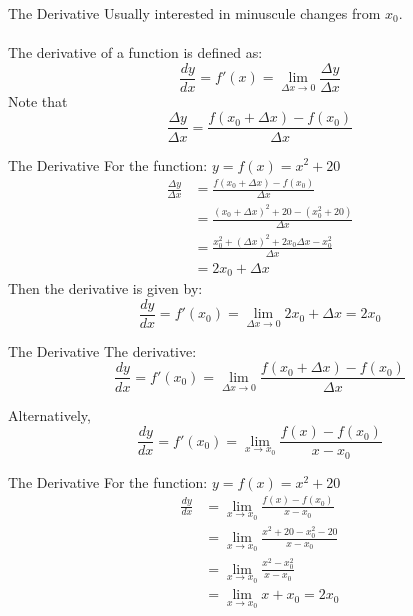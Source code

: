 \documentclass{./../../Latex/teaching_slides}
\begin{document}
\begin{frame}{The Derivative}
Usually interested in minuscule changes from $x_0$. \\~\\
The derivative of a function is defined as:
$$ \frac{d y}{d x} = f'(x)= \lim_{\Delta x \rightarrow 0} \frac{\Delta y}{\Delta x} $$
\vspace{1em}
Note that $$ \frac{\Delta y}{\Delta x}=\frac{f\left(x_{0}+\Delta x\right)-f\left(x_{0}\right)}{\Delta x}  $$
\end{frame}

\begin{frame}{The Derivative}
For the function: $y=f(x)=x^{2}+20$
\begin{align*} \frac{\Delta y}{\Delta x}&=\frac{f\left(x_{0}+\Delta x\right)-f\left(x_{0}\right)}{\Delta x} \\
&= \frac{(x_0+\Delta x)^2+20-(x_0^2+20)}{\Delta x} \\
&= \frac{x_0^2+ (\Delta x)^2+2 x_0 \Delta x-x_0^2}{\Delta x} \\&= 2 x_0 + \Delta x
\end{align*} 
Then the derivative is given by: 
$$ \frac{d y}{d x} = f'(x_0)= \lim_{\Delta x \rightarrow 0} 2 x_0 + \Delta x = 2 x_0 $$
\end{frame}

\begin{frame}{The Derivative}
The derivative:
$$ \frac{d y}{d x} = f'(x_0)= \lim_{\Delta x \rightarrow 0} \frac{f\left(x_{0}+\Delta x\right)-f\left(x_{0}\right)}{\Delta x} $$
\vspace{1em}

Alternatively, 
$$ \frac{d y}{d x} = f'(x_0)= \lim_{ x \rightarrow x_0} \frac{f(x)-f(x_{0})}{x-x_0}  $$
\end{frame}

\begin{frame}{The Derivative}
For the function: $y=f(x)=x^{2}+20$
\begin{align*} \frac{d y}{d x}&= \lim_{ x \rightarrow x_0} \frac{f(x)-f(x_{0})}{x-x_0} \\
& = \lim_{ x \rightarrow x_0} \frac{x^2+20-x_0^2-20}{x-x_0} \\
& = \lim_{ x \rightarrow x_0} \frac{x^2-x_0^2}{x-x_0} \\
& = \lim_{ x \rightarrow x_0} x+x_0 = 2x_0
\end{align*}
\end{frame}
\end{document}
